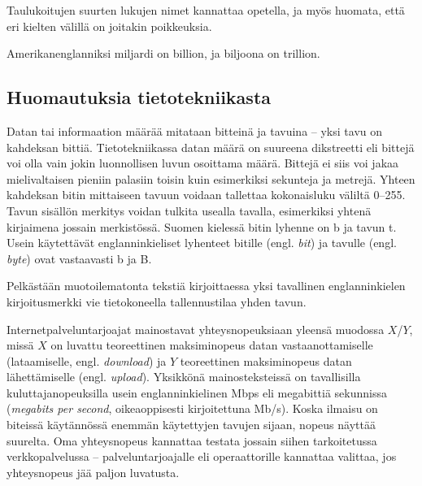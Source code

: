 Taulukoitujen suurten lukujen nimet kannattaa opetella, ja myös huomata, että eri kielten välillä on joitakin poikkeuksia.
\begin{esimerkki}
Amerikanenglanniksi miljardi on billion, ja biljoona on trillion.
\end{esimerkki}


\subsection*{Huomautuksia tietotekniikasta}

Datan tai informaation määrää mitataan bitteinä ja tavuina -- yksi tavu on kahdeksan bittiä. Tietotekniikassa datan määrä on suureena dikstreetti eli bittejä voi olla vain jokin luonnollisen luvun osoittama määrä. Bittejä ei siis voi jakaa mielivaltaisen pieniin palasiin toisin kuin esimerkiksi sekunteja ja metrejä. Yhteen kahdeksan bitin mittaiseen tavuun voidaan tallettaa kokonaisluku väliltä 0--255. Tavun sisällön merkitys voidan tulkita usealla tavalla, esimerkiksi yhtenä kirjaimena jossain merkistössä. Suomen kielessä bitin lyhenne on b ja tavun t. Usein käytettävät englanninkieliset lyhenteet bitille (engl. \textit{bit}) ja tavulle (engl. \textit{byte}) ovat vastaavasti b ja B.

\begin{esimerkki} %
Pelkästään muotoilematonta tekstiä kirjoittaessa yksi tavallinen englanninkielen kirjoitusmerkki vie tietokoneella tallennustilaa yhden tavun. %

Internetpalveluntarjoajat mainostavat yhteysnopeuksiaan yleensä muodossa $X$/$Y$, missä $X$ on luvattu teoreettinen maksiminopeus datan vastaanottamiselle (lataamiselle, engl. \textit{download}) ja $Y$ teoreettinen maksiminopeus datan lähettämiselle (engl. \textit{upload}). Yksikkönä mainosteksteissä on tavallisilla kuluttajanopeuksilla usein englanninkielinen Mbps eli megabittiä sekunnissa (\textit{megabits per second}, oikeaoppisesti kirjoitettuna Mb/s). Koska ilmaisu on biteissä käytännössä enemmän käytettyjen tavujen sijaan, nopeus näyttää suurelta. Oma yhteysnopeus kannattaa testata jossain siihen tarkoitetussa verkkopalvelussa -- palveluntarjoajalle eli operaattorille kannattaa valittaa, jos yhteysnopeus jää paljon luvatusta.
\end{esimerkki}

